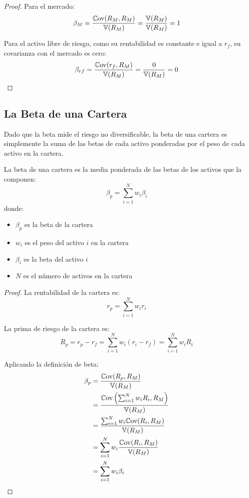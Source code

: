 \begin{proof}
Para el mercado:
\begin{equation}
\beta_M = \frac{\mathbb{C}\text{ov}(R_M, R_M)}{\mathbb{V}(R_M)} = \frac{\mathbb{V}(R_M)}{\mathbb{V}(R_M)} = 1
\end{equation}

Para el activo libre de riesgo, como su rentabilidad es constante e igual a $r_f$, su covarianza con el mercado es cero:
\begin{equation}
\beta_{rf} = \frac{\mathbb{C}\text{ov}(r_f, R_M)}{\mathbb{V}(R_M)} = \frac{0}{\mathbb{V}(R_M)} = 0
\end{equation}
\end{proof}

\subsection{La Beta de una Cartera}

Dado que la beta mide el riesgo no diversificable, la beta de una cartera es simplemente la suma de las betas de cada activo ponderadas por el peso de cada activo en la cartera.

\begin{teorema}
La beta de una cartera es la media ponderada de las betas de los activos que la componen:
\begin{equation}
\beta_p = \sum_{i=1}^{N} w_i \beta_i
\end{equation}
donde:
\begin{itemize}
\item $\beta_p$ es la beta de la cartera
\item $w_i$ es el peso del activo $i$ en la cartera
\item $\beta_i$ es la beta del activo $i$
\item $N$ es el número de activos en la cartera
\end{itemize}
\end{teorema}

\begin{proof}
La rentabilidad de la cartera es:
$$r_p = \sum_{i=1}^{N} w_i r_i$$

La prima de riesgo de la cartera es:
$$R_p = r_p - r_f = \sum_{i=1}^{N} w_i (r_i - r_f) = \sum_{i=1}^{N} w_i R_i$$

Aplicando la definición de beta:
\begin{align*}
\beta_p &= \frac{\mathbb{C}\text{ov}(R_p, R_M)}{\mathbb{V}(R_M)} \\
&= \frac{\mathbb{C}\text{ov}\left(\sum_{i=1}^{N} w_i R_i, R_M\right)}{\mathbb{V}(R_M)} \\
&= \frac{\sum_{i=1}^{N} w_i \mathbb{C}\text{ov}(R_i, R_M)}{\mathbb{V}(R_M)} \\
&= \sum_{i=1}^{N} w_i \frac{\mathbb{C}\text{ov}(R_i, R_M)}{\mathbb{V}(R_M)} \\
&= \sum_{i=1}^{N} w_i \beta_i
\end{align*}
\end{proof}

